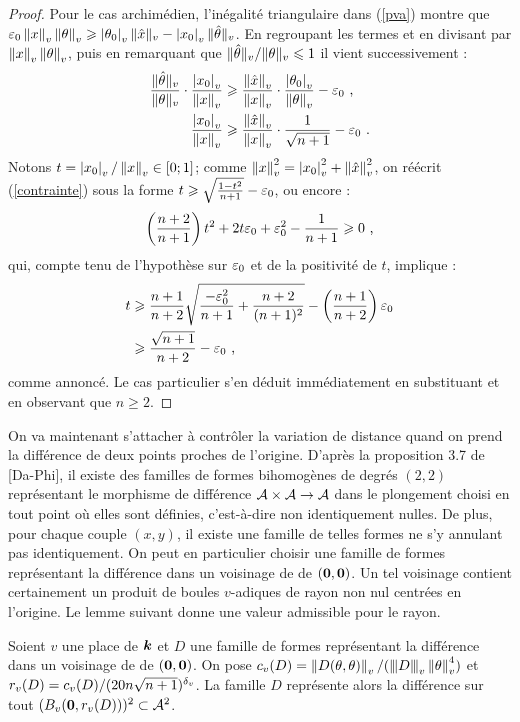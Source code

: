 \begin{proof}
Pour le cas archimédien, l'inégalité triangulaire dans (\ref{pva}) montre que $\varepsilon_0 \left\lVert x\right\rVert_{v}\left\lVert\theta\right\rVert_{v}  \geqslant \left\lvert\theta_0\right\rvert_{v}\|\hat{x}\|_{v} - \left\lvert x_0\right\rvert_{v}\|\hat{\theta}\|_{v} $. En regroupant les termes et en divisant par $\left\lVert x\right\rVert_{v}\left\lVert\theta\right\rVert_{v}$, puis en remarquant que $\|\hat{\theta}\|_{v}/\|\theta\|_{v} \leqslant 1$ il vient successivement :
\begin{align}
\frac{\|\hat{\theta}\|_{v}}{\|\theta\|_{v}} \cdot \frac{\left\lvert x_0\right\rvert_{v}}{\left\lVert x\right\rVert_{v}}
	& \geqslant \frac{\left\lVert\hat{x}\right\rVert_{v}}{\left\lVert x\right\rVert_{v}}\cdot \frac{\left\lvert\theta_0\right\rvert_{v}}{\left\lVert\theta\right\rVert_{v}} - \varepsilon_0 \text{ ,} \notag \\
\frac{\left\lvert x_0\right\rvert_{v}}{\left\lVert x\right\rVert_{v}} & \geqslant \frac{\left\lVert\hat{x}\right\rVert_{v}}{\left\lVert x\right\rVert_{v}}\cdot\frac{1}{\sqrt{n+1}} - \varepsilon_0 \text{ .} \label{contrainte}
\end{align}
Notons $t = \left\lvert x_0\right\rvert_{v}/\left\lVert x\right\rVert_{v} \in [0; 1]$; comme $\left\lVert x\right\rVert_{v}^2 = \left\lvert x_0\right\rvert_{v}^2 + \left\lVert\hat{x}\right\rVert_{v}^2$, on réécrit (\ref{contrainte}) sous la forme $t \geqslant \sqrt{\frac{1-t^2}{n+1}}-\varepsilon_0$, ou encore :
\[ \left(\frac{n+2}{n+1}\right)t^2 + 2t\varepsilon_0 + \varepsilon_0^2 - \frac{1}{n+1} \geqslant 0 \text{ ,}\]
qui, compte tenu de l'hypothèse sur $\varepsilon_0$ et de la positivité de $t$, implique :
\begin{align*}
t & \geqslant \frac{n+1}{n+2}\sqrt{\frac{-\varepsilon_0^2}{n+1}+\frac{n+2}{(n+1)^2}} - \left(\frac{n+1}{n+2}\right)\varepsilon_0\\
& \geqslant \frac{\sqrt{n+1}}{n+2} - \varepsilon_0 \text{ ,}
\end{align*}
comme annoncé. Le cas particulier s'en déduit immédiatement en substituant et en observant que $n \ge 2$.
\end{proof}

On va maintenant s'attacher à contrôler la variation de distance quand on prend la différence de deux points proches de l'origine. D'après la proposition 3.7 de [Da-Phi], il existe des familles de formes bihomogènes de degrés $(2, 2)$ représentant le morphisme de différence $\mathcal{A}\times\mathcal{A} \to \mathcal{A}$ dans le plongement choisi en tout point où elles sont définies, c'est-à-dire non identiquement nulles. De plus, pour chaque couple $(x, y)$, il existe une famille de telles formes ne s'y annulant pas identiquement. On peut en particulier choisir une famille de formes représentant la différence dans un voisinage de  de $({\boldsymbol{0}}, {\boldsymbol{0}})$. Un tel voisinage contient certainement un produit de boules $v$-adiques de rayon non nul centrées en l'origine. Le lemme suivant donne une valeur admissible pour le rayon.

\begin{lem} \label{rayonRel}
Soient $v$ une place de $\boldsymbol{k}$ et $D$ une famille de formes représentant la différence dans un voisinage de  de $({\boldsymbol{0}}, {\boldsymbol{0}})$. On pose $c_v(D) = \left\lVert D(\theta, \theta)\right\rVert_{v}/(\left\lvert\hspace{-1pt}\left\lvert\hspace{-1pt}\left\lvert D\right\rvert\hspace{-1pt}\right\rvert\hspace{-1pt}\right\rvert_{v}\left\lVert\theta\right\rVert_{v}^4)$ et $r_v(D) = c_v(D)/(20n\sqrt{n+1})^{\delta_v}$. La famille $D$ représente alors la différence sur tout $(B_v({\boldsymbol{0}}, r_v(D)))^2 \subset \mathcal{A}^2$.
\end{lem}

